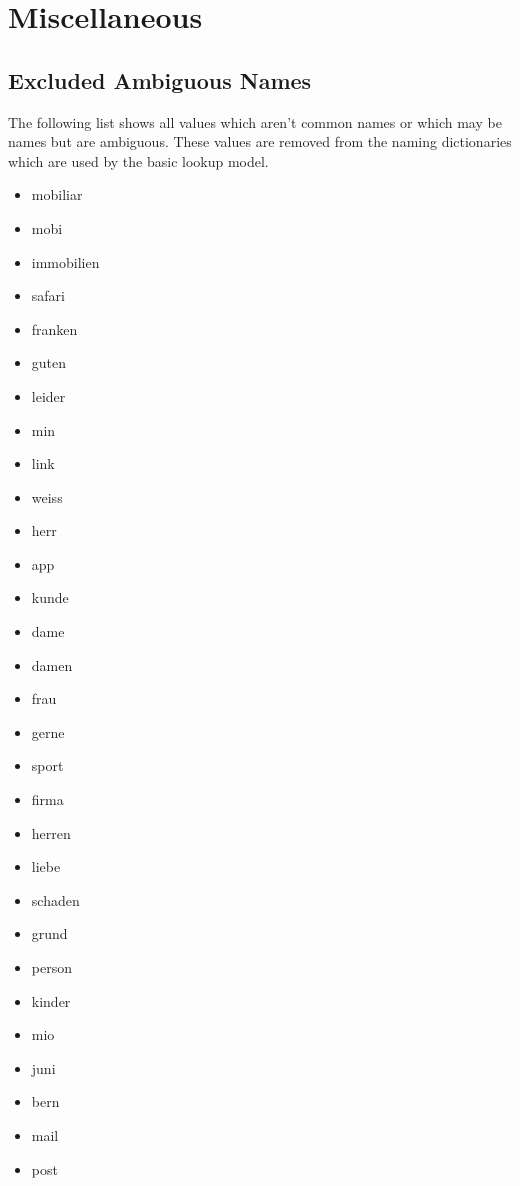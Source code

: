 \section{Miscellaneous}

\subsection{Excluded Ambiguous Names}
\label{lst:excluded-names}

The following list shows all values which aren't common names or which may be names but are ambiguous. These values are removed from the naming dictionaries which are used by the basic lookup model.

\begin{multicols}{4}
    \begin{itemize}
        \item mobiliar
        \item mobi
        \item immobilien
        \item safari
        \item franken
        \item guten
        \item leider
        \item min
        \item link
        \item weiss
        \item herr
        \item app
        \item kunde
        \item dame
        \item damen
        \item frau
        \item gerne
        \item sport
        \item firma
        \item herren
        \item liebe
        \item schaden
        \item grund
        \item person
        \item kinder
        \item mio
        \item juni
        \item bern
        \item mail
        \item post

\end{itemize}
\end{multicols}
